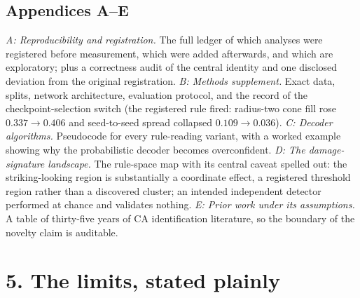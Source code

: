 \documentclass[11pt,a4paper]{article}
\begin{document}
\subsection*{Appendices A--E}

\emph{A: Reproducibility and registration.} The full ledger of which
analyses were registered before measurement, which were added afterwards,
and which are exploratory; plus a correctness audit of the central identity
and one disclosed deviation from the original registration. \emph{B:
Methods supplement.} Exact data, splits, network architecture, evaluation
protocol, and the record of the checkpoint-selection switch (the registered
rule fired: radius-two cone fill rose $0.337\to0.406$ and seed-to-seed
spread collapsed $0.109\to0.036$). \emph{C: Decoder algorithms.} Pseudocode
for every rule-reading variant, with a worked example showing why the
probabilistic decoder becomes overconfident. \emph{D: The damage-signature
landscape.} The rule-space map with its central caveat spelled out: the
striking-looking region is substantially a coordinate effect, a registered
threshold region rather than a discovered cluster; an intended independent
detector performed at chance and validates nothing. \emph{E: Prior work
under its assumptions.} A table of thirty-five years of CA identification
literature, so the boundary of the novelty claim is auditable.

\section*{5. The limits, stated plainly}
\end{document}
